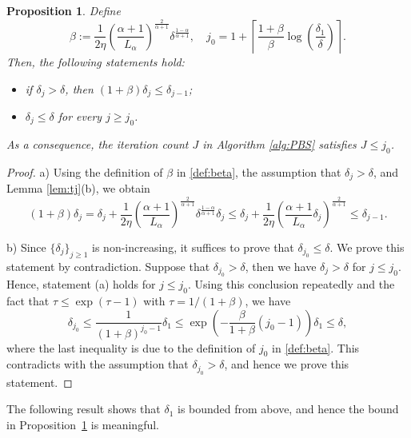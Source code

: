 \documentclass[11pt,letterpaper]{article}
\newtheorem{proposition}[thm]{Proposition}
\begin{document}
\begin{proposition}\label{prop:tj}
Define
\begin{equation}\label{def:beta}
    \beta := \frac{1}{2\eta} \left(\frac{\alpha+1}{L_\alpha} \right)^{\frac{2}{\alpha+1}} \delta^{\frac{1-\alpha}{\alpha+1}}, \quad 
    j_0=1+\left\lceil\frac{1+\beta}{\beta} \log\left(\frac{\delta_1}{\delta}\right)\right\rceil.
\end{equation}
Then, the following statements hold:
\begin{itemize}
    \item[a)] if $\delta_j>\delta$, then $(1+\beta)\delta_j\le 
    \delta_{j-1}$;
    \item[b)] $\delta_j\le \delta$ for every $j\ge j_0$.
\end{itemize}
As a consequence, the iteration count $J$ in Algorithm \ref{alg:PBS} satisfies $J\le j_0$.
\end{proposition}

\begin{proof}
a) Using the definition of $\beta$ in \eqref{def:beta}, the assumption that $\delta_j>\delta$, and Lemma \ref{lem:tj}(b), we obtain
\[
(1+\beta) \delta_j = \delta_j + \frac{1}{2\eta} \left(\frac{\alpha+1}{L_\alpha} \right)^{\frac{2}{\alpha+1}} \delta^{\frac{1-\alpha}{\alpha+1}} \delta_j
\le \delta_j + \frac{1}{2\eta} \left(\frac{\alpha+1}{L_\alpha} \delta_j\right)^{\frac{2}{\alpha+1}}
\le \delta_{j-1}.
\]

b) Since $\{\delta_j\}_{j\ge 1}$ is non-increasing, it suffices to prove that $\delta_{j_0}\le\delta$.
We prove this statement by contradiction. Suppose that $\delta_{j_0}>\delta$, then we have $\delta_j>\delta$ for $j\le j_0$.
Hence, statement (a) holds for $j\le j_0$. Using this conclusion repeatedly
and the fact that $\tau \le \exp(\tau -1)$ with $\tau=1/(1+\beta)$, we have
\[
\delta_{j_0}\le \frac{1}{(1+\beta)^{j_0-1}} \delta_1 \le \exp\left(-\frac{\beta}{1+\beta}(j_0-1)\right) \delta_1 \le \delta,
\]
where the last inequality is due to the definition of $j_0$ in \eqref{def:beta}.
This contradicts with the assumption that $\delta_{j_0}>\delta$, and hence we prove this statement.
\end{proof}


The following result shows that $\delta_1$ is bounded from above, and hence the bound in Proposition~\ref{prop:tj} is meaningful.
\end{document}
